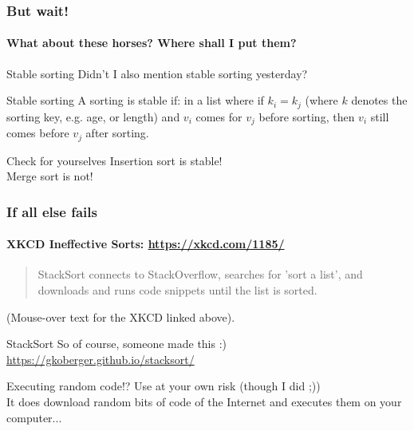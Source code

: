 \begin{frame}
	\frametitle{But wait!}
	\framesubtitle{What about these horses? Where shall I put them?}
	
	\begin{questionblock}{Stable sorting}
		Didn't I also mention stable sorting yesterday?
	\end{questionblock}
	\pause
		\begin{block}{Stable sorting}
			A sorting is stable if: in a list where if $k_i = k_j$ (where $k$ denotes the sorting key,
			e.g. age, or length) and $v_i$ comes for $v_j$ before sorting, then $v_i$ still comes before $v_j$ after sorting.
		\end{block}	
		\pause
			\begin{exampleblock}{Check for yourselves}
				Insertion sort is stable!\\
				Merge sort is not!
			\end{exampleblock}	
\end{frame}

\begin{frame}
	\frametitle{If all else fails}
	\framesubtitle{XKCD Ineffective Sorts: \url{https://xkcd.com/1185/}}
	\begin{quote}
		StackSort connects to StackOverflow, searches for 'sort a list', and downloads and runs code snippets until the list is sorted.
	\end{quote}
	(Mouse-over text for the XKCD linked above).
	\pause
		\begin{exampleblock}{StackSort}
			So of course, someone made this :)\\
			\url{https://gkoberger.github.io/stacksort/}
		\end{exampleblock}	
			\begin{alertblock}{Executing random code!?}
				Use at your own risk (though I did ;))\\
				It does download random bits of code of the Internet and executes them on your computer...
			\end{alertblock}	

	
\end{frame}
